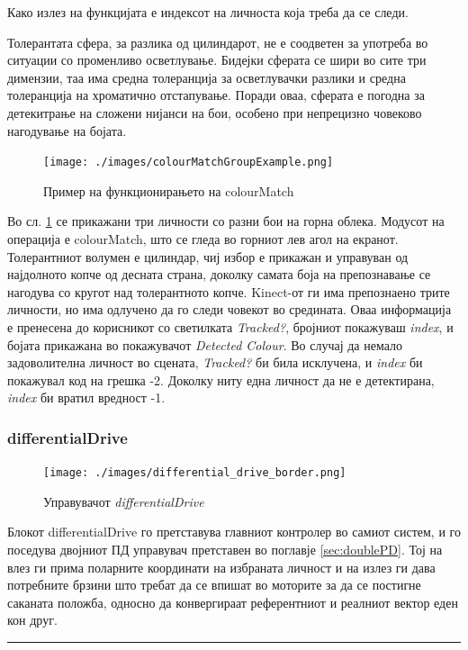 \documentclass[11pt]{article}
\begin{document}
        Како излез на функцијата е индексот на личноста која треба да се следи.

        Толерантата сфера, за разлика од цилиндарот, не е соодветен за употреба во ситуации со променливо осветлување. Бидејки сферата се шири во сите три димензии, таа има средна толеранција за осветлувачки разлики и средна толеранција на хроматично отстапување. Поради оваа, сферата е погодна за детекитрање на сложени нијанси на бои, особено при непрецизно човеково нагодување на бојата.

      \begin{figure}[h]
        \centering
        \texttt{[image: ./images/colourMatchGroupExample.png]}
        \caption{Пример на функционирањето на colourMatch}
        \label{fig:exampleColourMatch}
      \end{figure}

      Во сл. \ref{fig:exampleColourMatch} се прикажани три личности со разни бои на горна облека. Модусот на операција е colourMatch, што се гледа во горниот лев агол на екранот. Толерантниот волумен е цилиндар, чиј избор е прикажан и управуван од најдолното копче од десната страна, доколку самата боја на препознавање се нагодува со кругот над толерантното копче. Kinect-от ги има препознаено трите личности, но има одлучено да го следи човекот во средината. Оваа информација е пренесена до корисникот со светилката \textit{Tracked?}, бројниот покажуваш \textit{index}, и бојата прикажана во покажувачот \textit{Detected Colour}. Во случај да немало задоволителна личност во сцената, \textit{Tracked?} би била исклучена, и \textit{index} би покажувал код на грешка -2. Доколку ниту една личност да не е детектирана, \textit{index} би вратил вредност -1.

    \subsubsection{differentialDrive}
	    \begin{figure}[H]
        \centering
	      \texttt{[image: ./images/differential\_drive\_border.png]}
		    \caption{Управувачот \textit{differentialDrive}}
	      \label{fig:diffDrive}
	      \end{figure}
      Блокот differentialDrive го претставува главниот контролер во самиот систем, и го поседува двојниот ПД управувач претставен во поглавје \ref{sec:doublePD}. Тој на влез ги прима поларните координати на избраната личност и на излез ги дава потребните брзини што требат да се впишат во моторите за да се постигне саканата положба, односно да конвергираат референтниот и реалниот вектор еден кон друг.
      \\
      \textcolor[RGB]{150,150,150}{\rule{\linewidth}{1.6pt}}
\end{document}
